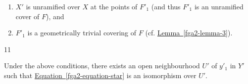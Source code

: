   
 \begin{enumerate}
    
 \item[ii.]
      \(X'\) is unramified over \(X\) at the points of \(F'_1\) (and thus \(F'_1\) is an unramified cover of \(F\)), and
    

    
 \item[iii.]
      \(F'_1\) is a geometrically trivial covering of \(F\) (cf. \hyperref[fga2-lemma-3]{Lemma~\ref*{fga2-lemma-3}}).
    

  \end{enumerate}\begin{theorem}{11}\label{fga2-theorem-11}\skipsinglepar\par{}Under the above conditions, there exists an open neighbourhood \(U'\) of \(y'_1\) in \(Y'\) such that \hyperref[fga2-equation-star]{Equation~\ref*{fga2-equation-star}} is an isomorphism over \(U'\).
    

\end{theorem}
